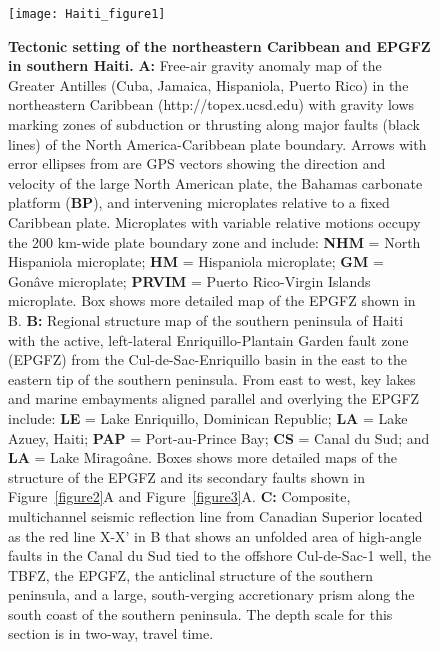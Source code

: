 \documentclass[linenumbers,draft]{agujournal}
\begin{document}
\clearpage



\begin{figure}
\centering
\texttt{[image: Haiti\_figure1]}
\caption{\textbf{Tectonic setting of the northeastern Caribbean and EPGFZ in southern Haiti.} \textbf{A:}
Free-air gravity anomaly map of the Greater Antilles (Cuba, Jamaica, Hispaniola, Puerto Rico) in the northeastern Caribbean (http://topex.ucsd.edu) with gravity lows marking zones of subduction or thrusting along major faults (black lines) of the North America-Caribbean plate boundary. Arrows with error ellipses from \citet{calais2010transpressional} are GPS vectors showing the direction and velocity of the large North American plate, the Bahamas carbonate platform (\textbf{BP}), and intervening microplates relative to a fixed Caribbean plate. Microplates with variable relative motions occupy the 200 km-wide plate boundary zone and include: \textbf{NHM} = North Hispaniola microplate; \textbf{HM} = Hispaniola microplate; \textbf{GM} = Gon\^ave microplate; \textbf{PRVIM} = Puerto Rico-Virgin Islands microplate. Box shows more detailed map of the EPGFZ shown in B. \textbf{B:} Regional structure map of the southern peninsula of Haiti with the active, left-lateral Enriquillo-Plantain Garden fault zone (EPGFZ) from the Cul-de-Sac-Enriquillo basin in the east to the eastern tip of the southern peninsula. From east to west, key lakes and marine embayments aligned parallel and overlying the EPGFZ include: \textbf{LE} = Lake Enriquillo, Dominican Republic; \textbf{LA} = Lake Azuey, Haiti; \textbf{PAP} = Port-au-Prince Bay; \textbf{CS }= Canal du Sud; and \textbf{LA} = Lake Mirago\^ane. Boxes shows more detailed maps of the structure of the EPGFZ and its secondary faults shown in Figure~\ref{figure2}A and Figure~\ref{figure3}A. \textbf{C:} Composite, multichannel seismic reflection line from Canadian Superior located as the red line X-X' in B that shows an unfolded area of high-angle faults in the Canal du Sud tied to the offshore Cul-de-Sac-1 well, the TBFZ, the EPGFZ, the anticlinal structure of the southern peninsula, and a large, south-verging accretionary prism along the south coast of the southern peninsula. The depth scale for this section is in two-way, travel time.}
\label{figure1}
\end{figure}
\end{document}
